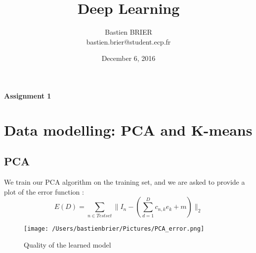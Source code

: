 \documentclass[11pt, oneside]{article}   	%
\title{Deep Learning}
\author{Bastien BRIER\\ bastien.brier@student.ecp.fr}
\date{December 6, 2016}				%
\begin{document}
\maketitle
\vspace{-10pt}
\begin{center}
{\LARGE \bf Assignment 1}\\
\vspace{10pt}
\end{center}

\section{Data modelling: PCA and K-means}
\vspace{4pt}
	
	\subsection{PCA}
		We train our PCA algorithm on the training set, and we are asked to provide a plot of the error function :
		\[E(D)=\sum_{n\in Testset}\|I_n-\left(\sum\limits_{d=1}^Dc_{n,k}e_k+m\right)\|_2\]
		\begin{figure}[h]
			\centering
			\caption{Quality of the learned model\label{PCA}}
			\texttt{[image: /Users/bastienbrier/Pictures/PCA\_error.png]}
		\end{figure}
		
\end{document}

